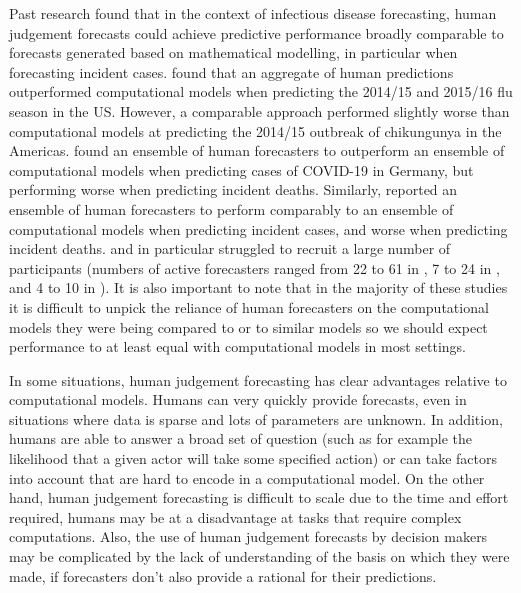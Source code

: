 \documentclass[10pt,a4paper,twocolumn]{article}
\begin{document}
Past research found that in the context of infectious disease forecasting, human judgement forecasts could achieve predictive performance broadly comparable to forecasts generated based on mathematical modelling, in particular when forecasting incident cases. \citet{farrowHumanJudgmentApproach2017} found that an aggregate of human predictions outperformed computational models when predicting the 2014/15 and 2015/16 flu season in the US. However, a comparable approach performed slightly worse than computational models at predicting the 2014/15 outbreak of chikungunya in the Americas. 
\citet{bosseComparingHumanModelbased2022} found an ensemble of human forecasters to outperform an ensemble of computational models when predicting cases of COVID-19 in Germany, but performing worse when predicting incident deaths. Similarly, \citet{mcandrewChimericForecastingCombining2022} reported an ensemble of human forecasters to perform comparably to an ensemble of computational models when predicting incident cases, and worse when predicting incident deaths. \citet{farrowHumanJudgmentApproach2017} and in particular \citet{bosseComparingHumanModelbased2022} struggled to recruit a large number of participants (numbers of active forecasters ranged from 22 to 61 in \citet{mcandrewChimericForecastingCombining2022}, 7 to 24 in \citet{farrowHumanJudgmentApproach2017}, and 4 to 10 in \citet{bosseComparingHumanModelbased2022}). 
It is also important to note that in the majority of these studies it is difficult to unpick the reliance of human forecasters on the computational models they were being compared to or to similar models so we should expect performance to at least equal with computational models in most settings.

In some situations, human judgement forecasting has clear advantages relative to computational models. Humans can very quickly provide forecasts, even in situations where data is sparse and lots of parameters are unknown. In addition, humans are able to answer a broad set of question (such as for example the likelihood that a given actor will take some specified action) or can take factors into account that are hard to encode in a computational model. On the other hand, human judgement forecasting is difficult to scale due to the time and effort required, humans may be at a disadvantage at tasks that require complex computations. Also, the use of human judgement forecasts by decision makers may be complicated by the lack of understanding of the basis on which they were made, if forecasters don't also provide a rational for their predictions.
\end{document}
